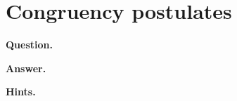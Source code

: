 \documentclass{article}
\begin{document}
\section*{Congruency postulates}
\textbf{Question.} 

\textbf{Answer.} 

\textbf{Hints.}
\begin{itemize}

\end{itemize}
\end{document}
